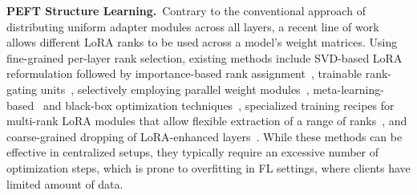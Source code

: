\noindent\textbf{PEFT Structure Learning.}~Contrary to the conventional approach of distributing uniform adapter modules across all layers, a recent line of work allows different LoRA ranks to be used across a model's weight matrices. Using fine-grained per-layer rank selection, existing methods include SVD-based LoRA reformulation followed by importance-based rank assignment~\cite{adalora}, trainable rank-gating units~\cite{sora2023emnlp}, selectively employing parallel weight modules~\cite{capaboost2024iclr}, meta-learning-based~\cite{autolora} and black-box optimization techniques~\cite{hpolorallm2024aaaiw}, specialized training recipes for multi-rank LoRA modules that allow flexible extraction of a range of ranks~\cite{dylora2023eacl}, and coarse-grained dropping of LoRA-enhanced layers~\cite{yao2024layer}. While these methods can be effective in centralized setups, they typically require an excessive number of optimization steps, which is prone to overfitting in FL settings, where clients have limited amount of data.